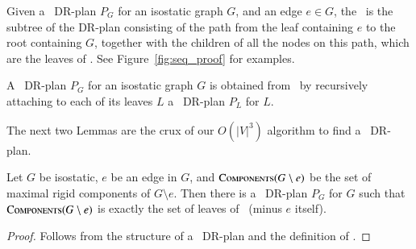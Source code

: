 \begin{definition}
[\Branch]
    Given a \pseudosequential\ DR-plan $P_G$ for an isostatic graph $G$, and an edge $e \in G$, the \branchGePG\ is the subtree of the DR-plan consisting of the path from the leaf containing $e$ to the root containing $G$, together with the children of all the nodes on this path, which are the leaves of \branchGePG. See Figure~\ref{fig:seq_proof} for examples.
\end{definition}

\begin{observation}
\label{obs:seqplan_rec_from_branches}
    A \pseudosequential\ DR-plan $P_G$ for an isostatic graph $G$ is obtained from \branchGePG\ by recursively attaching to each of its leaves $L$ a \pseudosequential\ DR-plan $P_L$ for $L$.
\end{observation}

The next two Lemmas are the crux of our $O(|V|^3)$ algorithm to find a \pseudosequential\ DR-plan.

\begin{lemma}
    Let $G$ be isostatic, $e$ be an edge in $G$, and $\textsc{Components}(G\setminus e)$ be the set of maximal rigid components of $G\setminus e$. Then there is a \pseudosequential\ DR-plan $P_G$ for $G$ such that $\textsc{Components}(G\setminus e)$ is exactly the set of leaves of \branchGePG\ (minus $e$ itself).
\end{lemma}

\begin{proof}
    Follows from the structure of a \pseudosequential\ DR-plan and the definition of \branchGePG.
\end{proof}



\ClearMyMinHeight
{}


